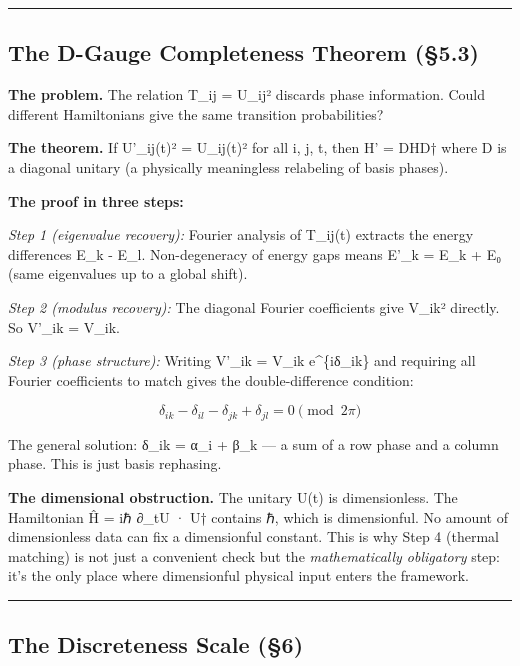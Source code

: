 \documentclass[
]{article}
\begin{document}
\begin{center}\rule{0.5\linewidth}{0.5pt}\end{center}

\hypertarget{the-d-gauge-completeness-theorem-5.3}{%
\subsection{The D-Gauge Completeness Theorem
(§5.3)}\label{the-d-gauge-completeness-theorem-5.3}}

\textbf{The problem.} The relation T\_ij = \textbar U\_ij\textbar²
discards phase information. Could different Hamiltonians give the same
transition probabilities?

\textbf{The theorem.} If \textbar U'\_ij(t)\textbar² =
\textbar U\_ij(t)\textbar² for all i, j, t, then H' = DHD† where D is a
diagonal unitary (a physically meaningless relabeling of basis phases).

\textbf{The proof in three steps:}

\emph{Step 1 (eigenvalue recovery):} Fourier analysis of T\_ij(t)
extracts the energy differences E\_k - E\_l. Non-degeneracy of energy
gaps means E'\_k = E\_k + E₀ (same eigenvalues up to a global shift).

\emph{Step 2 (modulus recovery):} The diagonal Fourier coefficients give
\textbar V\_ik\textbar² directly. So \textbar V'\_ik\textbar{} =
\textbar V\_ik\textbar.

\emph{Step 3 (phase structure):} Writing V'\_ik = V\_ik e\^{}\{iδ\_ik\}
and requiring all Fourier coefficients to match gives the
double-difference condition:

\[\delta_{ik} - \delta_{il} - \delta_{jk} + \delta_{jl} = 0 \pmod{2\pi}\]

The general solution: δ\_ik = α\_i + β\_k --- a sum of a row phase and a
column phase. This is just basis rephasing.

\textbf{The dimensional obstruction.} The unitary U(t) is dimensionless.
The Hamiltonian Ĥ = iℏ ∂\_tU · U† contains ℏ, which is dimensionful. No
amount of dimensionless data can fix a dimensionful constant. This is
why Step 4 (thermal matching) is not just a convenient check but the
\emph{mathematically obligatory} step: it's the only place where
dimensionful physical input enters the framework.

\begin{center}\rule{0.5\linewidth}{0.5pt}\end{center}

\hypertarget{the-discreteness-scale-6}{%
\subsection{The Discreteness Scale
(§6)}\label{the-discreteness-scale-6}}
\end{document}
